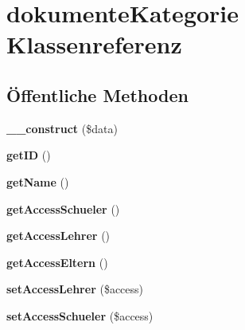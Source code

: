 \hypertarget{classdokumente_kategorie}{}\section{dokumente\+Kategorie Klassenreferenz}
\label{classdokumente_kategorie}
\subsection*{Öffentliche Methoden}
\begin{DoxyCompactItemize}
\item 
\mbox{\label{classdokumente_kategorie_aac1b494cd3f4abc8e6d6ba4d94d91385}} 
{\bfseries \+\_\+\+\_\+construct} (\$data)
\item 
\mbox{\label{classdokumente_kategorie_aa00620518e0921cde96dd83ed57d4e36}} 
{\bfseries get\+ID} ()
\item 
\mbox{\label{classdokumente_kategorie_a399e44ef7987af52d1a568540ea361e3}} 
{\bfseries get\+Name} ()
\item 
\mbox{\label{classdokumente_kategorie_a3ac281f32fc6a5bfa655bfa35d185b0f}} 
{\bfseries get\+Access\+Schueler} ()
\item 
\mbox{\label{classdokumente_kategorie_a65629a4de96715aab50a418006b37fd2}} 
{\bfseries get\+Access\+Lehrer} ()
\item 
\mbox{\label{classdokumente_kategorie_a447e88d89e8938c5c2587e0cb3b13882}} 
{\bfseries get\+Access\+Eltern} ()
\item 
\mbox{\label{classdokumente_kategorie_a2b822769befa60e39913a147d96fbd12}} 
{\bfseries set\+Access\+Lehrer} (\$access)
\item 
\mbox{\label{classdokumente_kategorie_a9c02e64a0d14a88133af6178973c088b}} 
{\bfseries set\+Access\+Schueler} (\$access)
\item 
\mbox{\label{classdokumente_kategorie_aef832199377306875efffebd6425280f}} 

\end{DoxyCompactItemize}
